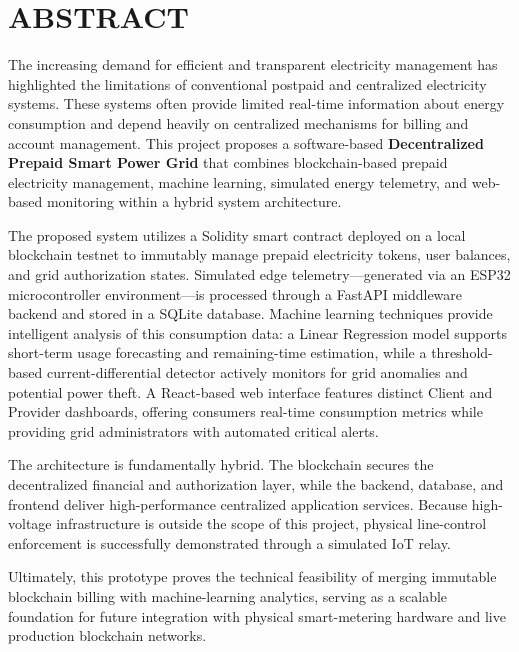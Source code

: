 \chapter*{ABSTRACT}


The increasing demand for efficient and transparent electricity management has highlighted the limitations of conventional postpaid and centralized electricity systems. These systems often provide limited real-time information about energy consumption and depend heavily on centralized mechanisms for billing and account management. This project proposes a software-based \textbf{Decentralized Prepaid Smart Power Grid} that combines blockchain-based prepaid electricity management, machine learning, simulated energy telemetry, and web-based monitoring within a hybrid system architecture.

The proposed system utilizes a Solidity smart contract deployed on a local blockchain testnet to immutably manage prepaid electricity tokens, user balances, and grid authorization states. Simulated edge telemetry---generated via an ESP32 microcontroller environment---is processed through a FastAPI middleware backend and stored in a SQLite database. Machine learning techniques provide intelligent analysis of this consumption data: a Linear Regression model supports short-term usage forecasting and remaining-time estimation, while a threshold-based current-differential detector actively monitors for grid anomalies and potential power theft. A React-based web interface features distinct Client and Provider dashboards, offering consumers real-time consumption metrics while providing grid administrators with automated critical alerts.

The architecture is fundamentally hybrid. The blockchain secures the decentralized financial and authorization layer, while the backend, database, and frontend deliver high-performance centralized application services. Because high-voltage infrastructure is outside the scope of this project, physical line-control enforcement is successfully demonstrated through a simulated IoT relay.

Ultimately, this prototype proves the technical feasibility of merging immutable blockchain billing with machine-learning analytics, serving as a scalable foundation for future integration with physical smart-metering hardware and live production blockchain networks.
